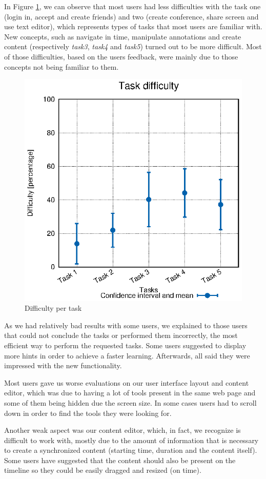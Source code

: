 \documentclass[10pt,conference]{IEEEtran}
\begin{document}
In Figure \ref{fig:user_diffs}, we can observe that most users had less difficulties with the task one (login in, accept and create friends) and two (create conference, share screen and use text editor), which represents types of tasks that most users are familiar with.
New concepts, such as navigate in time, manipulate annotations and create content (respectively \emph{task3}, \emph{task4} and \emph{task5}) turned out to be more difficult.
 Most of those difficulties, based on the users feedback, were mainly due to those concepts not being familiar to them.


\begin{figure}
  \centering
    \includegraphics[width=0.75\linewidth]{stats/user_diffs.eps}
  \caption{Difficulty per task}
  \label{fig:user_diffs}
\end{figure}


As we had relatively bad results with some users, we explained to those users that could not conclude the tasks or performed them incorrectly, the most efficient way to perform the requested tasks.
Some users suggested to display more hints in order to achieve a faster learning.
Afterwards, all said they were impressed with the new functionality.

Most users gave us worse evaluations on our user interface layout and content editor, which was due to having a lot of tools present in the same web page and some of them being hidden due the screen size.
In some cases users had to scroll down in order to find the tools they were looking for. 

Another weak aspect was our content editor, which, in fact, we recognize is difficult to work with, mostly due to the amount of information that is necessary to create a synchronized content (starting time, duration and the content itself).
Some users have suggested that the content should also be present on the timeline so they could be easily dragged and resized (on time).
\end{document}
